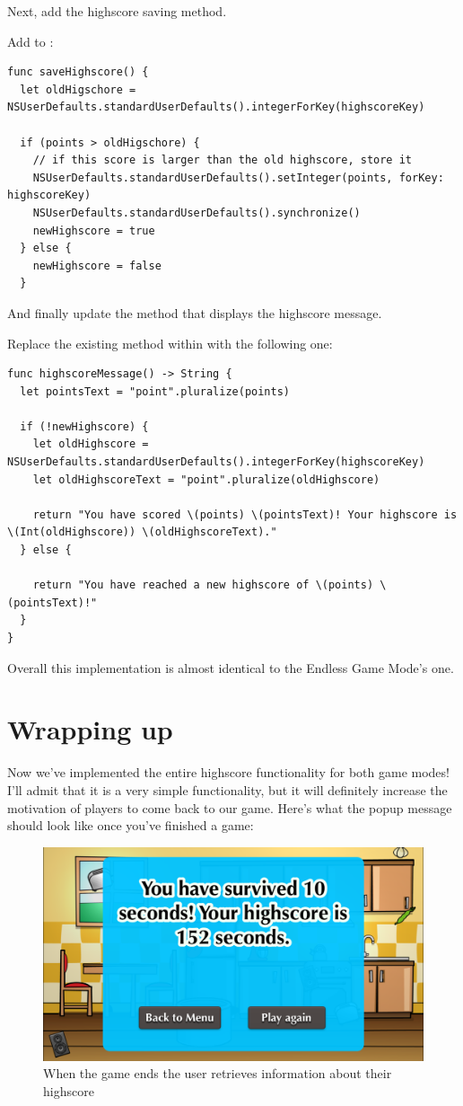 Next, add the highscore saving method.

\begin{leftbar}
Add  to :
\begin{lstlisting}
func saveHighscore() {
  let oldHigschore = NSUserDefaults.standardUserDefaults().integerForKey(highscoreKey)
  
  if (points > oldHigschore) {
    // if this score is larger than the old highscore, store it
    NSUserDefaults.standardUserDefaults().setInteger(points, forKey: highscoreKey)
    NSUserDefaults.standardUserDefaults().synchronize()
    newHighscore = true
  } else {
    newHighscore = false
  }
\end{lstlisting}
\end{leftbar}

And finally update the method that displays the highscore message.
\begin{leftbar}
Replace the existing  method within
 with the following one:
\begin{lstlisting}
func highscoreMessage() -> String {
  let pointsText = "point".pluralize(points)
  
  if (!newHighscore) {
    let oldHighscore = NSUserDefaults.standardUserDefaults().integerForKey(highscoreKey)
    let oldHighscoreText = "point".pluralize(oldHighscore)
    
    return "You have scored \(points) \(pointsText)! Your highscore is \(Int(oldHighscore)) \(oldHighscoreText)."
  } else {
    
    return "You have reached a new highscore of \(points) \(pointsText)!"
  }
}
\end{lstlisting}
\end{leftbar}
Overall this implementation is almost identical to the Endless Game Mode's one.

\section{Wrapping up}

Now we've implemented the entire highscore functionality for both game modes!
I'll admit that it is a very simple functionality, but it will definitely
increase the motivation of players to come back to our game. Here's what the
popup message should look like once you've finished a game:

\begin{figure}[H]
    \centering
    \includegraphics[width=0.6\linewidth]{images/Chapter8/Highscore_Message.png}
    \caption{When the game ends the user retrieves information about their
    highscore}
\end{figure}


